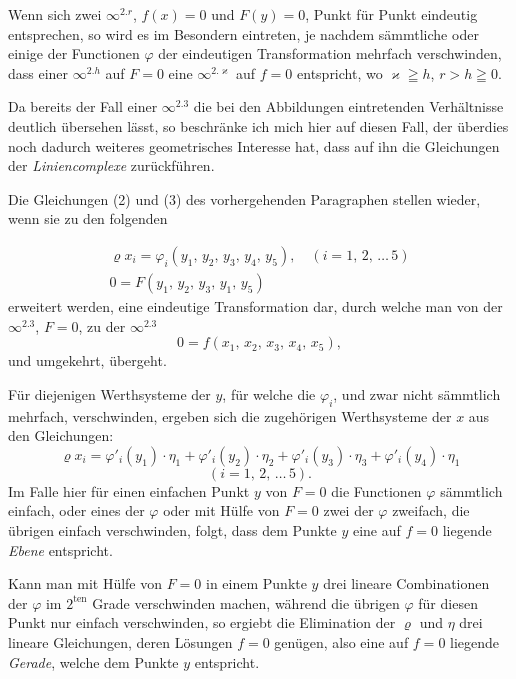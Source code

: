 \documentclass{article}
\begin{document}
Wenn sich zwei $\infty^{2.r}$, $f(x) = 0$ und $F(y) = 0$, Punkt für Punkt eindeutig entsprechen, so wird es im Besondern eintreten, je nachdem sämmtliche oder einige der Functionen $\varphi$ der eindeutigen Transformation mehrfach verschwinden, dass einer $\infty^{2.h}$ auf $F = 0$ eine $\infty^{2.\varkappa}$ auf $f = 0$ entspricht, wo $\varkappa \geqq h$, $r > h \geqq 0$.

Da bereits der Fall einer $\infty^{2.3}$ die bei den Abbildungen eintretenden Verhältnisse deutlich übersehen lässt, so beschränke ich mich hier auf diesen Fall, der überdies noch dadurch weiteres geometrisches Interesse hat, dass auf ihn die Gleichungen der \emph{Liniencomplexe} zurückführen.

Die Gleichungen (2) und (3) des vorhergehenden Paragraphen stellen wieder, wenn sie zu den folgenden

\[
\begin{gathered}
\varrho x_i = \varphi_i (y_1,\, y_2,\, y_3,\, y_4,\, y_5), \quad (i = 1,\, 2,\, \dots\, 5) \\
0 = F(y_1,\, y_2,\, y_3,\, y_1,\, y_5)
\end{gathered}
\]
erweitert werden, eine eindeutige Transformation dar, durch welche man von der $\infty^{2.3}$, $F = 0$, zu der $\infty^{2.3}$
\[
0 = f(x_1,\, x_2,\, x_3,\, x_4,\, x_5),
\]
und umgekehrt, übergeht.

Für diejenigen Werthsysteme der $y$, für welche die $\varphi_i$, und zwar nicht sämmtlich mehrfach, verschwinden, ergeben sich die zugehörigen Werthsysteme der $x$ aus den Gleichungen:
\[
\varrho x_i = \varphi'_i(y_1) \cdot \eta_1 + \varphi'_i(y_2) \cdot \eta_2 + \varphi'_i(y_3) \cdot \eta_3 + \varphi'_i(y_4) \cdot \eta_1
\]
\[
(i = 1,\, 2,\, \dots\, 5).
\]
Im Falle hier für einen einfachen Punkt $y$ von $F = 0$ die Functionen $\varphi$ sämmtlich einfach, oder eines der $\varphi$ oder mit Hülfe von $F = 0$ zwei der $\varphi$ zweifach, die übrigen einfach verschwinden, folgt, dass dem Punkte $y$ eine auf $f = 0$ liegende \emph{Ebene} entspricht.

Kann man mit Hülfe von $F = 0$ in einem Punkte $y$ drei lineare Combinationen der $\varphi$ im $2^{\text{ten}}$ Grade verschwinden machen, während die übrigen $\varphi$ für diesen Punkt nur einfach verschwinden, so ergiebt die Elimination der $\varrho$ und $\eta$ drei lineare Gleichungen, deren Lösungen $f = 0$ genügen, also eine auf $f = 0$ liegende \emph{Gerade}, welche dem Punkte $y$ entspricht.
\end{document}
